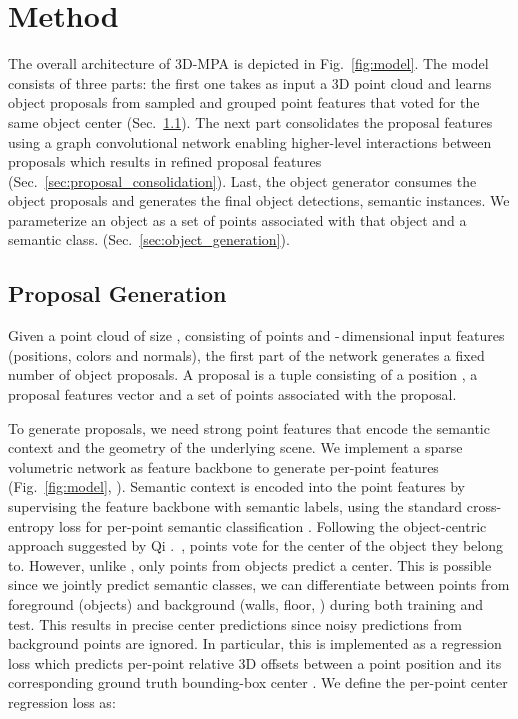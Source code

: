 \documentclass[10pt,twocolumn,letterpaper]{article}
\newcommand{\refsec}[1]{Sec.~\ref{sec:#1}}
\newcommand{\reffig}[1]{Fig.~\ref{fig:#1}}
\newcommand{\colorsquare}[1]{{\color{#1}}\hspace{-7.78pt}}
\newcommand{\name}{3D-MPA}
\begin{document}
 \section{Method}
The overall architecture of \name{} is depicted in \reffig{model}.
The model consists of three parts:
the first one takes as input a 3D point cloud and learns object proposals from sampled and grouped point features that voted for the same object center (\refsec{proposal_generation}).
The next part consolidates the proposal features using a graph convolutional network enabling higher-level interactions between proposals which results in refined proposal features (\refsec{proposal_consolidation}).
Last, the object generator consumes the object proposals and generates the final object detections, \ie semantic instances.
We parameterize an object as a set of points associated with that object and a semantic class. (\refsec{object_generation}).

\subsection{Proposal Generation}
\label{sec:proposal_generation}
Given a point cloud of size , consisting of  points and -\,dimensional input features (\eg positions, colors and normals),
the first part of the network generates a fixed number  of object proposals.
A proposal is a tuple  consisting of
a position ,
a proposal features vector 
and a set of points  associated with the proposal.

To generate proposals, we need strong point features that encode the semantic context and the geometry of the underlying scene.
We implement a sparse volumetric network \cite{Choy19CVPR, Graham18CVPR} as feature backbone to generate per-point features  (\reffig{model}, \colorsquare{m_green}).
Semantic context is encoded into the point features by supervising the feature backbone with semantic labels,
using the standard cross-entropy loss for per-point semantic classification .
Following the object-centric approach suggested by Qi \etal.~\cite{Qi19ICCV}, points vote for the center of the object they belong to.
However, unlike \cite{Qi19ICCV}, only points from objects predict a center.
This is possible since we jointly predict semantic classes, \ie we can differentiate between points from foreground (objects) and background (walls, floor, \etc) during both training and test.
This results in precise center predictions since noisy predictions from background points are ignored.
In particular, this is implemented as a regression loss which predicts per-point  relative 3D offsets  between a point position  and its corresponding ground truth bounding-box center . We define the per-point center regression loss as:
\end{document}

